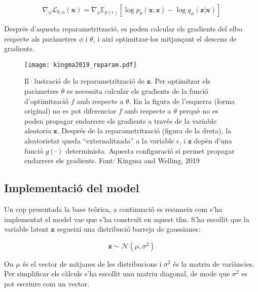 \documentclass[CAT,BIB]{TFUOC}%
\begin{document}
        \begin{equation}
        \label{eq:gradient_phi_reparam}
            \nabla_\phi \mathcal{L}_{\theta,\phi}(\mathbf{x}) =
            \nabla_\phi \mathbb{E}_{p(\epsilon)} [
                \log p_\theta(\mathbf{x,z}) -
                \log q_\phi(\mathbf{z|x})
            ]
        \end{equation}

        Després d'aquesta reparametrització,
        es poden calcular els gradients del \gls{elbo}
        respecte als paràmetres $\phi$ i $\theta$,
        i així optimitzar-los mitjançant el descens de gradients.

        \begin{figure}
            \centering
            \texttt{[image: kingma2019\_reparam.pdf]}
            \caption{
                Il·lustració de la reparametrització de $\mathbf{z}$.
                Per optimitzar els paràmetres $\theta$
                es necessita calcular els gradients de la funció d'optimització $f$
                amb respecte a $\theta$.
                En la figura de l'esquerra (forma original)
                no es pot diferenciar $f$ amb respecte a $\theta$
                perquè no es poden propagar endarrere els gradients
                a través de la variable aleatoria $\mathbf{z}$.
                Després de la reparametrització (figura de la dreta),
                la aleatorietat queda ``externalitzada'' a la variable $\epsilon$,
                i $\mathbf{z}$ depèn d'una funció $g(\cdot)$ determinista.
                Aquesta configuració sí permet propagar endarrere els gradients.
                Font: Kingma and Welling, 2019 \citep{Kingma2019}
            }
            \label{fig:reparametritzacio}
        \end{figure}

    \subsection{Implementació del model}
    \label{s:vae_implementacio}

        Un cop presentada la base teòrica,
        a continuació es resumeix com s'ha implementat el model \gls{vae}
        que s'ha construït en aquest \gls{tfm}.
        S'ha escollit que la variable latent $\mathbf{z}$
        segueixi una distribució barreja de gaussianes:

        $$\mathbf{z} \sim \mathcal{N}(\mu, \sigma^2)$$

        On $\mu$ és el vector de mitjanes de les distribucions
        i $\sigma^2$ és la matriu de variàncies.
        Per simplificar els càlculs s'ha escollit una matriu diagonal,
        de mode que $\sigma^2$ es pot escriure com un vector.
\end{document}

